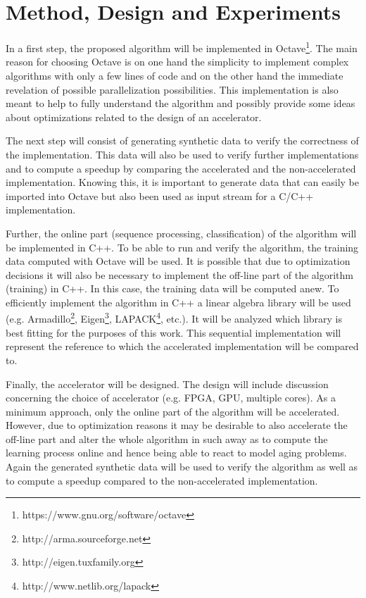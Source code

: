 \documentclass[12pt]{article} %
\begin{document}

\section{Method, Design and Experiments} %

In a first step, the proposed algorithm will be implemented in
Octave\footnote{https://www.gnu.org/software/octave}. The main reason for
choosing Octave is on one hand the simplicity to implement complex algorithms
with only a few lines of code and on the other hand the immediate revelation of
possible parallelization possibilities. This implementation is also meant to
help to fully understand the algorithm and possibly provide some ideas about
optimizations related to the design of an accelerator.

The next step will consist of generating synthetic data to verify the
correctness of the implementation. This data will also be used to verify
further implementations and to compute a speedup by comparing the accelerated
and the non-accelerated implementation. Knowing this, it is important to
generate data that can easily be imported into Octave but also been used as
input stream for a C/C++ implementation.

Further, the online part (sequence processing, classification) of the algorithm
will be implemented in C++. To be able to run and verify the algorithm, the
training data computed with Octave will be used. It is possible that due to
optimization decisions it will also be necessary to implement the off-line part
of the algorithm (training) in C++. In this case, the training data will be
computed anew. To efficiently implement the algorithm in C++ a linear algebra
library will be used (e.g. Armadillo\footnote{http://arma.sourceforge.net},
Eigen\footnote{http://eigen.tuxfamily.org},
LAPACK\footnote{http://www.netlib.org/lapack}, etc.).  It will be analyzed
which library is best fitting for the purposes of this work. This sequential
implementation will represent the reference to which the accelerated
implementation will be compared to.

Finally, the accelerator will be designed. The design will include discussion
concerning the choice of accelerator (e.g. FPGA, GPU, multiple cores). As
a minimum approach, only the online part of the algorithm will be accelerated.
However, due to optimization reasons it may be desirable to also accelerate the
off-line part and alter the whole algorithm in such away as to compute the
learning process online and hence being able to react to model aging problems.
Again the generated synthetic data will be used to verify the algorithm as well
as to compute a speedup compared to the non-accelerated implementation.
\end{document}
